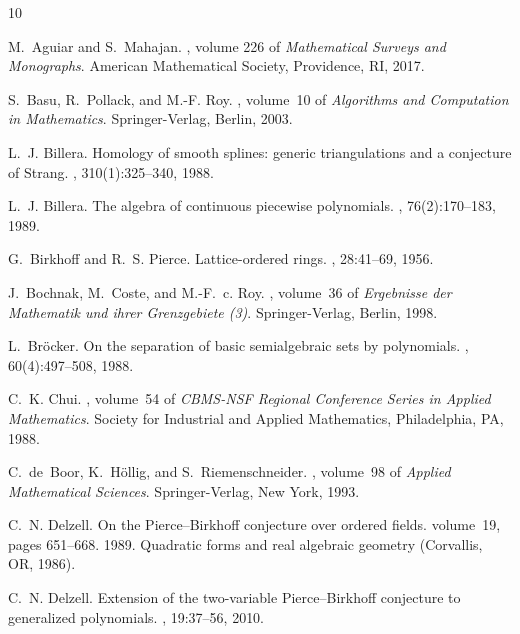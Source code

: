 \documentclass[11pt]{amsart}
\theoremstyle{plain}
\theoremstyle{definition}
\begin{document}

\begin{thebibliography}{10}

M.~Aguiar and S.~Mahajan.
, volume 226 of {\em
  Mathematical Surveys and Monographs}.
\newblock American Mathematical Society, Providence, RI, 2017.

S.~Basu, R.~Pollack, and M.-F. Roy.
, volume~10 of {\em
  Algorithms and Computation in Mathematics}.
\newblock Springer-Verlag, Berlin, 2003.

L.~J. Billera.
\newblock Homology of smooth splines: generic triangulations and a conjecture
  of {S}trang.
, 310(1):325--340, 1988.

L.~J. Billera.
\newblock The algebra of continuous piecewise polynomials.
, 76(2):170--183, 1989.

G.~Birkhoff and R.~S. Pierce.
\newblock Lattice-ordered rings.
, 28:41--69, 1956.

J.~Bochnak, M.~Coste, and M.-F.~c. Roy.
, volume~36 of {\em Ergebnisse der
  Mathematik und ihrer Grenzgebiete (3)}.
\newblock Springer-Verlag, Berlin, 1998.

L.~Br\"ocker.
\newblock On the separation of basic semialgebraic sets by polynomials.
, 60(4):497--508, 1988.

C.~K. Chui.
, volume~54 of {\em CBMS-NSF Regional
  Conference Series in Applied Mathematics}.
\newblock Society for Industrial and Applied Mathematics, Philadelphia, PA,
  1988.

C.~de~Boor, K.~H\"{o}llig, and S.~Riemenschneider.
, volume~98 of {\em Applied Mathematical Sciences}.
\newblock Springer-Verlag, New York, 1993.

C.~N. Delzell.
\newblock On the {P}ierce--{B}irkhoff conjecture over ordered fields.
\newblock volume~19, pages 651--668. 1989.
\newblock Quadratic forms and real algebraic geometry (Corvallis, OR, 1986).

C.~N. Delzell.
\newblock Extension of the two-variable {P}ierce--{B}irkhoff conjecture to
  generalized polynomials.
, 19:37--56, 2010.


\end{thebibliography}
\end{document}

